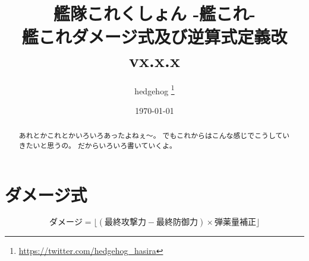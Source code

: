 \documentclass[10pt, a4paper]{jsarticle}
\title{
    艦隊これくしょん -艦これ- \\ \vspace{3mm}
    \Huge 艦これダメージ式及び逆算式定義改vx.x.x
}
\author{
    \Large{hedgehog}
    \thanks{{\url{https://twitter.com/hedgehog_hasira}}}
}
\date{\today}
\begin{document}
\maketitle
\begin{abstract}
あれとかこれとかいろいろあったよねぇ～。
でもこれからはこんな感じでこうしていきたいと思うの。
だからいろいろ書いていくよ。
\end{abstract}


\section{ダメージ式}

\[
    ダメージ = \big\lfloor (最終攻撃力 - 最終防御力) \times 弾薬量補正 \big\rfloor
\]
\end{document}
